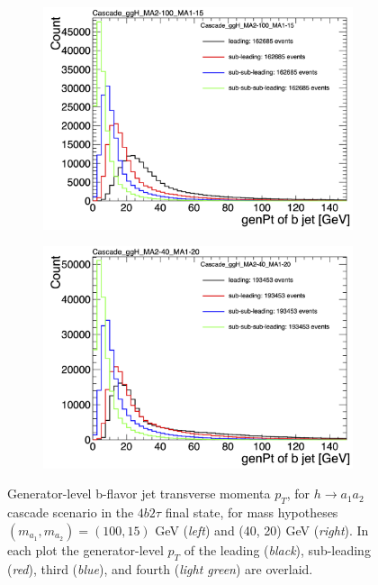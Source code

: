 \begin{figure}[ht]
    \centering
    \begin{subfigure}{0.45\textwidth}
        \includegraphics[width=1.0\textwidth]{figures/ch-11-asymmetric/Cascade_ggH_MA2-100_MA1-15_overlay}
    \end{subfigure}
    \hfill
    \begin{subfigure}{0.45\textwidth}
        \includegraphics[width=1.0\textwidth]{figures/ch-11-asymmetric/Cascade_ggH_MA2-40_MA1-20_overlay}
    \end{subfigure}  
    \caption{Generator-level b-flavor jet transverse momenta $p_{T}$, for $h \rightarrow a_1 a_2$ cascade scenario in the $4b2\tau$ final state, for mass hypotheses $(m_{a_1}, m_{a_2}) = (100, 15)$ GeV (\textit{left}) and (40, 20) GeV (\textit{right}). In each plot the generator-level $p_{T}$ of the leading (\textit{black}), sub-leading (\textit{red}), third (\textit{blue}), and fourth (\textit{light green}) are overlaid.}
    \label{fig:overlay_cascade_b_jet_gen_pT}
\end{figure}


